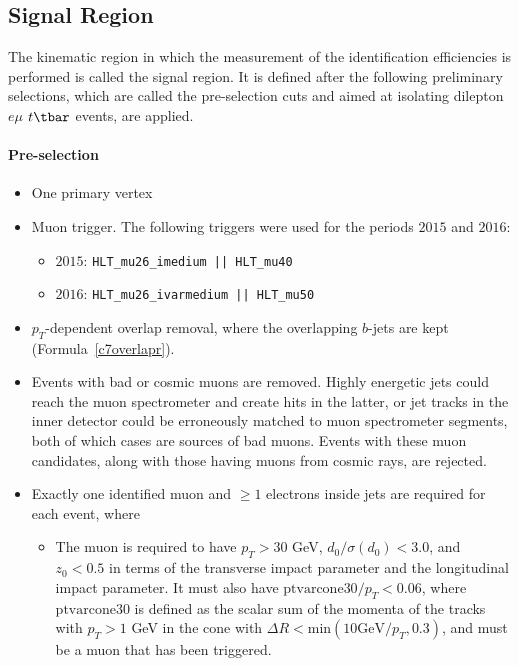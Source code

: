 \subsection{Signal Region}\label{ss:eidsr}

The kinematic region in which the measurement of the identification
efficiencies is performed is called the signal region. It is defined after the
following preliminary selections, which are called the pre-selection cuts and
aimed at isolating dilepton $e\mu$ $t\tbar$ events, are applied.

\paragraph{Pre-selection}

\begin{itemize}
	\item One primary vertex

	\item Muon trigger. The following triggers were used for the periods $2015$
	      and $2016$:

	      \begin{itemize}
		      \item $2015$: \texttt{HLT_mu26_imedium || HLT_mu40}
		      \item $2016$:  \texttt{HLT_mu26_ivarmedium || HLT_mu50}
	      \end{itemize}

	\item $p_T$-dependent overlap removal, where the overlapping $b$-jets are kept
	      (Formula~\ref{c7overlapr}).

	\item Events with bad or cosmic muons are removed. Highly energetic jets could
	      reach the muon spectrometer and create hits in the latter, or jet tracks in the
	      inner detector could be erroneously matched to muon spectrometer segments, both
	      of which cases are sources of bad muons. Events with these muon candidates,
	      along with those having muons from cosmic rays, are rejected.

	\item Exactly one identified muon and $\geq 1$ electrons inside jets are required
	      for each event, where

	      \begin{itemize}

		      \item The muon is required to have $p_T > 30$ GeV, $d_0 / \sigma(d_0) < 3.0$,
		            and $z_0 < 0.5$ in terms of the transverse impact parameter and the
		            longitudinal impact parameter. It must also have $\text{ptvarcone}30 / p_T <
			            0.06$, where $\text{ptvarcone}30$ is defined as the scalar sum of the momenta
		            of the tracks with $p_T > 1$ GeV in the cone with $\Delta R <
			            \text{min}(10\text{GeV}/p_T, 0.3)$, and must be a muon that has been triggered.


\end{itemize}
\end{itemize}
